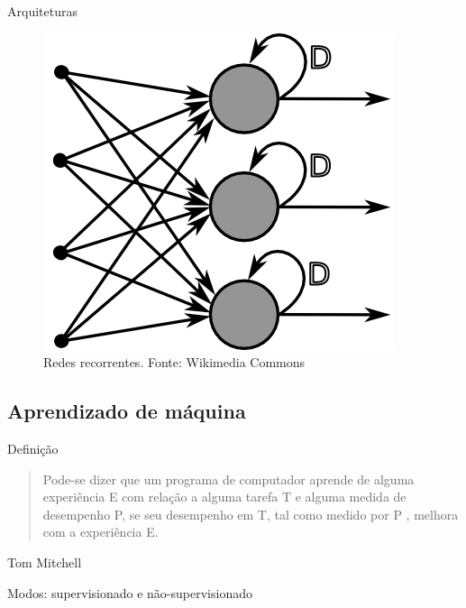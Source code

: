 \documentclass{beamer}
\begin{document}
      \begin{frame}{Arquiteturas}
	\begin{figure}[htpb]
	  \includegraphics[scale=0.4]{topo2.png}
	  \caption{Redes recorrentes. Fonte: Wikimedia Commons }
	\end{figure}
      \end{frame}
      
    \subsection{Aprendizado de máquina}
  
      \begin{frame}{Definição}
	\begin{quote}
	  Pode-se dizer que um programa de computador aprende de alguma experiência E  com relação a alguma tarefa T e alguma medida de desempenho P, se seu desempenho em T, tal como medido por P , melhora com a experiência E.
	\end{quote}
	Tom Mitchell
    
	Modos: supervisionado e não-supervisionado
      \end{frame}
   
\end{document}
